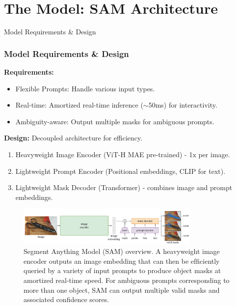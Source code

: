 \documentclass{beamer}
\begin{document}
\section{The Model: SAM Architecture}

\begin{frame}{Model Requirements & Design}
    \frametitle{Model Requirements \& Design}
    \textbf{Requirements:}
    \begin{itemize}
        \item Flexible Prompts: Handle various input types.
        \item Real-time: Amortized real-time inference ($\sim$50ms) for interactivity.
        \item Ambiguity-aware: Output multiple masks for ambiguous prompts.
    \end{itemize}
    \textbf{Design:} Decoupled architecture for efficiency.
    \begin{enumerate}
        \item Heavyweight Image Encoder (ViT-H MAE pre-trained) - 1x per image.
        \item Lightweight Prompt Encoder (Positional embeddings, CLIP for text).
        \item Lightweight Mask Decoder (Transformer) - combines image and prompt embeddings.
    \end{enumerate}
    \vfill
    \begin{figure}
        \centering
        \includegraphics[width=0.8\textwidth]{figures/SAM_overview.png}
        \caption{Segment Anything Model (SAM) overview. A heavyweight image encoder outputs an image embedding that can
        then be efﬁciently queried by a variety of input prompts to produce object masks at amortized real-time speed. For ambiguous
        prompts corresponding to more than one object, SAM can output multiple valid masks and associated conﬁdence scores.}
        \label{fig:sam_architecture}
    \end{figure}
\end{frame}
\end{document}
